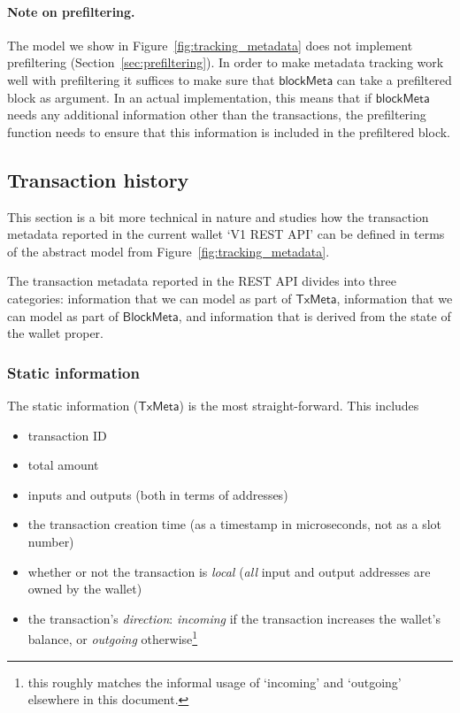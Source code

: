 \documentclass{article}
\numberwithin{equation}{lemma}
\begin{document}
\paragraph{Note on prefiltering.} The model we show in
Figure~\ref{fig:tracking_metadata} does not implement prefiltering
(Section~\ref{sec:prefiltering}). In order to make metadata tracking work well
with prefiltering it suffices to make sure that $\mathsf{blockMeta}$ can take a
prefiltered block as argument. In an actual implementation, this means that if
$\mathsf{blockMeta}$ needs any additional information other than the
transactions, the prefiltering function needs to ensure that this information
is included in the prefiltered block.

\subsection{Transaction history}
\label{sec:transaction_history}

This section is a bit more technical in nature and studies how the transaction
metadata reported in the current wallet `V1 REST API' can be defined in terms
of the abstract model from Figure~\ref{fig:tracking_metadata}.

The transaction metadata reported in the REST API divides into three categories:
information that we can model as part of $\mathsf{TxMeta}$, information that
we can model as part of $\mathsf{BlockMeta}$, and information that is derived
from the state of the wallet proper.

\subsubsection{Static information}

The static information ($\mathsf{TxMeta}$) is the most straight-forward.
This includes
%
\begin{itemize}
\item transaction ID
\item total amount
\item inputs and outputs (both in terms of addresses)
\item the transaction creation time
(as a timestamp in microseconds, not as a slot number)
\item whether or not the transaction is \emph{local}
(\emph{all} input and output addresses are owned by the wallet)
\item the transaction's \emph{direction}: \emph{incoming} if the transaction
increases the wallet's balance, or \emph{outgoing} otherwise\footnote{this
roughly matches the informal usage of `incoming' and `outgoing' elsewhere in
this document.}
\end{itemize}
\end{document}
